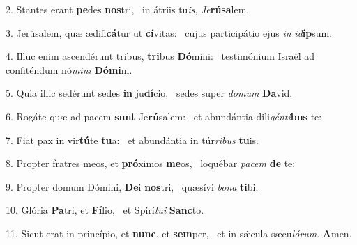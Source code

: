 2. Stantes erant \textbf{pe}des \textbf{nos}tri, \ast\  in átriis tu\textit{is}, \textit{Je}\textbf{rú}\textbf{sa}lem.\

3. Jerúsalem, quæ ædifi\textbf{cá}tur ut \textbf{cí}vitas: \ast\  cujus participátio ejus \textit{in} \textit{id}\textbf{íp}sum.\

4. Illuc enim ascendérunt tribus, \textbf{tri}bus \textbf{Dó}mini: \ast\  testimónium Israël ad confiténdum nó\textit{mi}\textit{ni} \textbf{Dó}\textbf{mi}ni.\

5. Quia illic sedérunt sedes \textbf{in} ju\textbf{dí}cio, \ast\  sedes super \textit{do}\textit{mum} \textbf{Da}vid.\

6. Rogáte quæ ad pacem \textbf{sunt} Je\textbf{rú}salem: \ast\  et abundántia dili\textit{gén}\textit{ti}\textbf{bus} te:\

7. Fiat pax in vir\textbf{tú}te \textbf{tu}a: \ast\  et abundántia in túr\textit{ri}\textit{bus} \textbf{tu}is.\

8. Propter fratres meos, et \textbf{pró}ximos \textbf{me}os, \ast\  loquébar \textit{pa}\textit{cem} \textbf{de} te:\

9. Propter domum Dómini, \textbf{De}i \textbf{nos}tri, \ast\  quæsívi \textit{bo}\textit{na} \textbf{ti}bi.\

10. Glória \textbf{Pa}tri, et \textbf{Fí}lio, \ast\  et Spirí\textit{tu}\textit{i} \textbf{Sanc}to.\

11. Sicut erat in princípio, et \textbf{nunc}, et \textbf{sem}per, \ast\  et in sǽcula sæcu\textit{ló}\textit{rum}. \textbf{A}men.\

